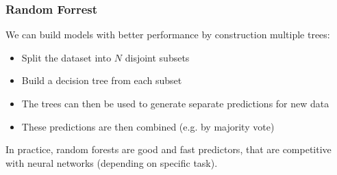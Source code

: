 \documentclass[mathserif,serif]{beamer}
\begin{document}
\begin{frame}
  \frametitle{Random Forrest}
  We can build models with better performance by construction multiple trees:
  \begin{itemize}
    \pause\item Split the dataset into $N$ disjoint subsets
    \pause\item Build a decision tree from each subset
    \pause\item The trees can then be used to generate separate predictions for new data
    \pause\item These predictions are then combined (e.g. by majority vote)
  \end{itemize}

  \pause
  In practice, random forests are good and fast predictors, that are competitive with neural networks
  (depending on specific task).
\end{frame}
\end{document}
